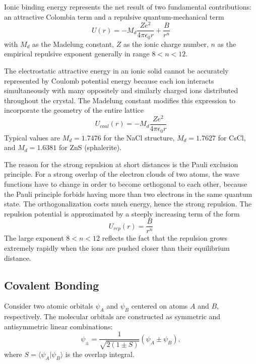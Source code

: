 \documentclass[../../../main.tex]{subfiles}
\begin{document}
Ionic binding energy represents the net result of two fundamental contributions: an attractive Colombia term and a repulsive quantum-mechanical term
\begin{equation*}
    U(r)=-M_d \frac{Ze^2 }{4\pi\epsilon_0r}+\frac{B }{r^n}
\end{equation*}
with $M_d$ as the Madelung constant, $Z$ as the ionic charge number, $n$ as the empirical repulsive exponent generally in range $8<n<12$.

The electrostatic attractive energy in an ionic solid cannot be accurately represented by Coulomb potential energy because each ion interacts simultaneously with many oppositely and similarly charged ions distributed throughout the crystal.
The Madelung constant modifies this expression to incorporate the geometry of the entire lattice
\begin{equation*}
    U_{coul}(r)=-M_d \frac{Ze^2 }{4\pi\epsilon_0r}
\end{equation*}
Typical values are $M_d=1.7476$ for the NaCl structure, $M_d=1.7627$ for CsCl, and  $M_d=1.6381$ for ZnS (sphalerite).

The reason for the strong repulsion at short distances is the Pauli exclusion principle.
For a strong overlap of the electron clouds of two atoms, the wave functions have to change in order to become orthogonal to each other, because the Pauli principle forbids having more than two electrons in the same quantum state.
The orthogonalization costs much energy, hence the strong repulsion.
The repulsion potential is approximated by a steeply increasing term of the form
\begin{equation*}
    U_{rep}(r)=\frac{B }{r^n}
\end{equation*}
The large exponent $8<n<12$ reflects the fact that the repulsion grows extremely rapidly when the ions are pushed closer than their equilibrium distance.

\subsection{Covalent Bonding}

Consider two atomic orbitals $\psi_A$ and $\psi_B$ centered on atoms $A$ and $B$, respectively.
The molecular orbitals are constructed as symmetric and antisymmetric linear combinations:
\begin{equation*}
    \psi_{\pm} = \frac{1}{\sqrt{2(1 \pm S)}} \left( \psi_A \pm \psi_B \right),
\end{equation*}
where $S = \langle \psi_A | \psi_B \rangle$ is the overlap integral.
\end{document}
